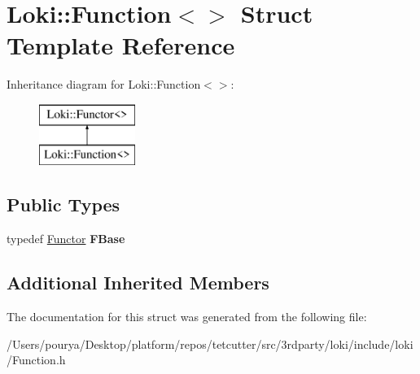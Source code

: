\hypertarget{structLoki_1_1Function_3_4}{}\section{Loki\+:\+:Function$<$$>$ Struct Template Reference}
\label{structLoki_1_1Function_3_4}
Inheritance diagram for Loki\+:\+:Function$<$$>$\+:\begin{figure}[H]
\begin{center}
\leavevmode
\includegraphics[height=2.000000cm]{structLoki_1_1Function_3_4}
\end{center}
\end{figure}
\subsection*{Public Types}
\begin{DoxyCompactItemize}
\item 
\hypertarget{structLoki_1_1Function_3_4_a9e8e3ca4405281b9f805504c50ebedf1}{}typedef \hyperlink{classLoki_1_1Functor}{Functor} {\bfseries F\+Base}\label{structLoki_1_1Function_3_4_a9e8e3ca4405281b9f805504c50ebedf1}

\end{DoxyCompactItemize}
\subsection*{Additional Inherited Members}


The documentation for this struct was generated from the following file\+:\begin{DoxyCompactItemize}
\item 
/\+Users/pourya/\+Desktop/platform/repos/tetcutter/src/3rdparty/loki/include/loki/Function.\+h\end{DoxyCompactItemize}
